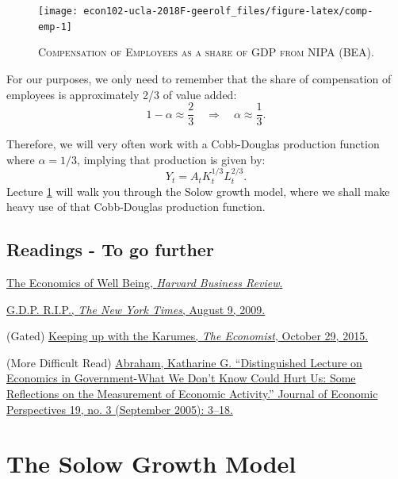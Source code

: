 \documentclass[]{book}
\begin{document}
\begin{figure}

{\centering \texttt{[image: econ102-ucla-2018F-geerolf\_files/figure-latex/comp-emp-1]} 

}

\caption{\textsc{Compensation of Employees as a share of GDP
from NIPA (BEA)}.}\label{fig:comp-emp}
\end{figure}

For our purposes, we only need to remember that the share of
compensation of employees is approximately 2/3 of value added:
\[1-\alpha \approx \frac{2}{3} \quad \Rightarrow \quad \boxed{\alpha \approx \frac{1}{3}}.\]

Therefore, we will very often work with a Cobb-Douglas production
function where \(\alpha=1/3\), implying that production is given by:
\[Y_t = A_t K_t^{1/3} L_t^{2/3}.\] Lecture \ref{solow} will walk you
through the Solow growth model, where we shall make heavy use of that
Cobb-Douglas production function.

\section*{Readings - To go further}\label{readings---to-go-further}

\href{https://hbr.org/2012/01/the-economics-of-well-being}{The Economics
of Well Being, \emph{Harvard Business Review}.}

\href{https://search.proquest.com/hnpnewyorktimes/docview/1030670685/A9EF0C9A254D4699PQ/1?accountid=14512}{G.D.P.
R.I.P., \emph{The New York Times}, August 9, 2009.}

(Gated)
\href{https://www.economist.com/news/finance-and-economics/21677223-new-study-shows-money-can-buy-you-happinessbut-only-fleetingly-others}{Keeping
up with the Karumes, \emph{The Economist}, October 29, 2015.}

(More Difficult Read)
\href{https://doi.org/10.1257/089533005774357833}{Abraham, Katharine G.
``Distinguished Lecture on Economics in Government-What We Don't Know
Could Hurt Us: Some Reflections on the Measurement of Economic
Activity.'' Journal of Economic Perspectives 19, no. 3 (September 2005):
3--18.}

\hypertarget{solow}{\chapter{The Solow Growth Model}\label{solow}}
\end{document}
